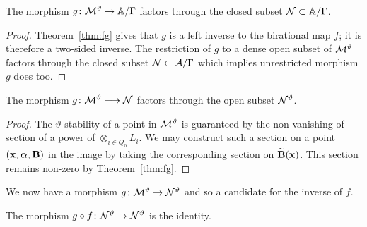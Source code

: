 \documentclass{amsart}
\newcommand{\balpha}{\boldsymbol{\alpha}}
\theoremstyle{definition}
\begin{document}
\begin{corollary}
The morphism $g \colon \mathcal{M}^\vartheta \rightarrow \mathbb{A}/\Gamma$ factors through the closed subset $\mathcal{N} \subset \mathbb{A}/\Gamma$.
\end{corollary}

\begin{proof}
Theorem~\ref{thm:fg} gives that $g$ is a left inverse to the birational map $f$; it is therefore a two-sided inverse.
The restriction of $g$ to a dense open subset of $\mathcal{M}^\vartheta$ factors through the closed subset $\mathcal{N} \subset \mathcal{A}/\Gamma$ which implies unrestricted morphism $g$ does too.
\end{proof}

\begin{corollary}
The morphism $g \colon \mathcal{M}^\vartheta \longrightarrow \mathcal{N}$ factors through the open subset $\mathcal{N}^\vartheta$.
\end{corollary}

\begin{proof}
The $\vartheta$-stability of a point in $\mathcal{M}^\vartheta$ is guaranteed by the non-vanishing of section of a power of $\otimes_{i \in Q_0} L_i$.
We may construct such a section on a point $(\bfx, \balpha, \bfB)$ in the image by taking the corresponding section on $\widetilde{\mathbf{B}}(\mathbf{x})$.
This section remains non-zero by Theorem~\ref{thm:fg}.
\end{proof}

We now have a morphism $g \colon \mathcal{M}^\vartheta \rightarrow \mathcal{N}^\vartheta$ and so a candidate for the inverse of $f$.

\begin{theorem}\label{thm:ghilb}
The morphism $g \circ f \colon \mathcal{N}^\vartheta \rightarrow \mathcal{N}^\vartheta$ is the identity.
\end{theorem}
\end{document}
